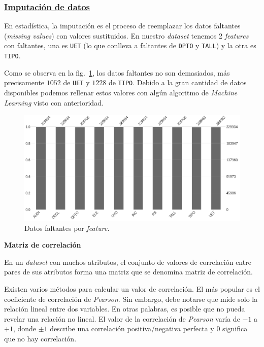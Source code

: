 \documentclass[a4paper,12pt]{article}
\begin{document}
		\subsubsection{\href{https://github.com/GeraCollante/tesis-icomp-machinelearning/blob/main/DataImputation.ipynb}{\color{blue}Imputación de datos}}\label{DataImputation}
						 
		En estadística, la imputación es el proceso de reemplazar los datos faltantes (\textit{missing values}) con valores sustituidos. En nuestro \textit{dataset} tenemos 2 \textit{features} con faltantes, una es \texttt{UET} (lo que conlleva a faltantes de \texttt{DPTO} y \texttt{TALL}) y la otra es \texttt{TIPO}.
						
		Como se observa en la fig.~\ref{fig:missingvalue}, los datos faltantes no son demasiados, más precisamente $1052$ de \texttt{UET} y $1228$ de \texttt{TIPO}. Debido a la gran cantidad de datos disponibles podemos rellenar estos valores con algún algoritmo de \textit{Machine Learning} visto con anterioridad.
						
		\begin{figure}[H]
			\begin{center}
				\includegraphics[width=1\textwidth]{tesis_66.png}
				\caption{Datos faltantes por \textit{feature}.}
				\label{fig:missingvalue}
			\end{center}
		\end{figure}
						
		\textbf{Matriz de correlación}
						
		En un \textit{dataset} con muchos atributos, el conjunto de valores de correlación entre pares de sus atributos forma una matriz que se denomina matriz de correlación.
						
		Existen varios métodos para calcular un valor de correlación. El más popular es el coeficiente de correlación de \textit{Pearson}. Sin embargo, debe notarse que mide solo la relación lineal entre dos variables. En otras palabras, es posible que no pueda revelar una relación no lineal. El valor de la correlación de \textit{Pearson} varía de $-1$ a $+1$, donde $\pm1$ describe una correlación positiva/negativa perfecta y $0$ significa que no hay correlación. \citep{corrmatrix}
						
\end{document}
